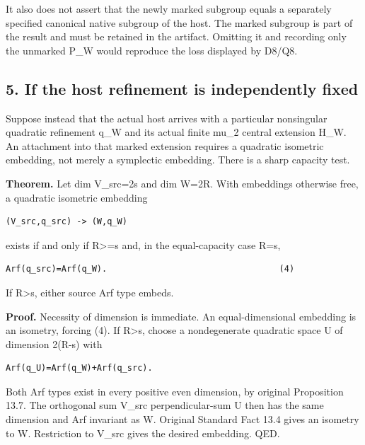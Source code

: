 It also does not assert that the newly marked subgroup equals a
separately specified canonical native subgroup of the host. The marked
subgroup is part of the result and must be retained in the artifact.
Omitting it and recording only the unmarked P\_W would reproduce the
loss displayed by D8/Q8.

\hypertarget{dyadic_markings-if-the-host-refinement-is-independently-fixed}{%
\subsection{5. If the host refinement is independently
fixed}\label{dyadic_markings-if-the-host-refinement-is-independently-fixed}}

Suppose instead that the actual host arrives with a particular
nonsingular quadratic refinement q\_W and its actual finite mu\_2
central extension H\_W. An attachment into that marked extension
requires a quadratic isometric embedding, not merely a symplectic
embedding. There is a sharp capacity test.

\textbf{Theorem.} Let dim V\_src=2s and dim W=2R. With embeddings
otherwise free, a quadratic isometric embedding

\begin{Verbatim}[fontsize=\small,breaklines=true,breakanywhere=true]
(V_src,q_src) -> (W,q_W)
\end{Verbatim}

exists if and only if R\textgreater=s and, in the equal-capacity case
R=s,

\begin{Verbatim}[fontsize=\small,breaklines=true,breakanywhere=true]
Arf(q_src)=Arf(q_W).                                  (4)
\end{Verbatim}

If R\textgreater s, either source Arf type embeds.

\textbf{Proof.} Necessity of dimension is immediate. An
equal-dimensional embedding is an isometry, forcing (4). If
R\textgreater s, choose a nondegenerate quadratic space U of
dimension 2(R-s) with

\begin{Verbatim}[fontsize=\small,breaklines=true,breakanywhere=true]
Arf(q_U)=Arf(q_W)+Arf(q_src).
\end{Verbatim}

Both Arf types exist in every positive even dimension, by original
Proposition 13.7. The orthogonal sum V\_src perpendicular-sum U then has
the same dimension and Arf invariant as W. Original Standard Fact 13.4
gives an isometry to W. Restriction to V\_src gives the desired
embedding. QED.

